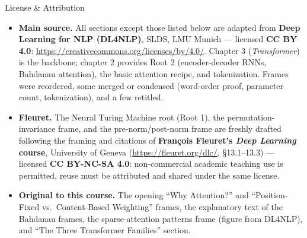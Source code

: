 \begin{vbframe}{License \& Attribution}
\begin{itemize}
\item \textbf{Main source.} All sections except those listed below are adapted from \textbf{Deep Learning for NLP (DL4NLP)}, SLDS, LMU Munich --- licensed \textbf{CC BY 4.0}: \url{https://creativecommons.org/licenses/by/4.0/}. Chapter 3 (\textit{Transformer}) is the backbone; chapter 2 provides Root 2 (encoder-decoder RNNs, Bahdanau attention), the basic attention recipe, and tokenization. Frames were reordered, some merged or condensed (word-order proof, parameter count, tokenization), and a few retitled.
\item \textbf{Fleuret.} The Neural Turing Machine root (Root 1), the permutation-invariance frame, and the pre-norm/post-norm frame are freshly drafted following the framing and citations of \textbf{François Fleuret's \textit{Deep Learning} course}, University of Geneva (\url{https://fleuret.org/dlc/}, \S13.1--13.3) --- licensed \textbf{CC BY-NC-SA 4.0}: non-commercial academic teaching use is permitted, reuse must be attributed and shared under the same license.
\item \textbf{Original to this course.} The opening \enquote{Why Attention?} and \enquote{Position-Fixed vs.\ Content-Based Weighting} frames, the explanatory text of the Bahdanau frames, the sparse-attention patterns frame (figure from DL4NLP), and \enquote{The Three Transformer Families} section.
\end{itemize}
\end{vbframe}

\endlecture


